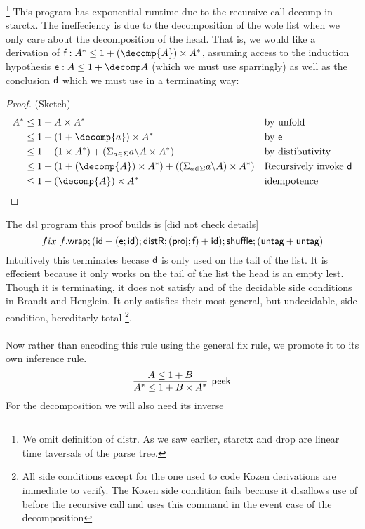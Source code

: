 \documentclass[a4paper,UKenglish,cleveref, autoref, thm-restate]{lipics-v2021}
\begin{document}
\footnote{We omit definition of \textsf{distr}. As we saw earlier, \textsf{starctx} and \textsf{drop} are linear time taversals of the parse tree.}
This program has exponential runtime due to the recursive call \textsf{decomp} in \textsf{starctx}. The ineffeciency is due to the decomposition of the wole list when we only care about the decomposition of the head. That is, we would like a derivation of $\dslcom{f} : A^* \leq 1 + (\decomp{A}) \times A^*$, assuming access to the induction hypothesis $ \dslcom{e} : A \leq 1 + \decomp A$ (which we must use sparringly) as well as the conclusion $\textsf{d}$ which we must use in a terminating way:
\begin{proof} (Sketch)
\begin{align}
A^* &\leq  1 + A \times A^* && \text{by unfold}\\
 &\leq 1 + (1 + \decomp{a}) \times A^* && \text{by } \dslcom{e}\\
 &\leq 1 + (1 \times A^*) + (\Sigma_{a \in \Sigma} \derive{a}{A} \times A^*) && \text{by distibutivity}\\
 &\leq 1 +  (1 + (\decomp{A}) \times A^*) + ((\Sigma_{a \in \Sigma} \derive{a}{A}) \times A^*) && \text{Recursively invoke  } \dslcom{d}  \\
 &\leq 1 + (\decomp{A}) \times A^* && \text{idempotence} 
\end{align}
\end{proof}
The dsl program this proof builds is [did not check details]
\[ \fix ~f.\dslcom{wrap};(\dslcom{id} + (\dslcom{e};\dslcom {id});\dslcom{distR};(\dslcom{proj};\dslcom{f})+\dslcom{id});\dslcom{shuffle};(\dslcom{untag} + \dslcom{untag}) \]
Intuitively this terminates becase $\textsf{d}$ is only used on the tail of the list. It is effecient because it only works on the tail of the list the head is an empty lest. Though it is terminating, it does not satisfy and of the decidable side conditions in Brandt and Henglein. It only satisfies their most general, but undecidable, side condition, hereditarly total \footnote{All side conditions except for the one used to code Kozen derivations are immediate to verify. The Kozen side condition fails because it disallows use of  before the recursive call and  uses this command in the event case of the decomposition}.\\\\
Now rather than encoding this rule using the general fix rule, we promote it to its own inference rule.  
\[ \infer[\dslcom{peek}]{A^* \leq 1 + B \times A^*}{A \leq 1 + B} \]
For the decomposition we will also need its inverse
\end{document}
